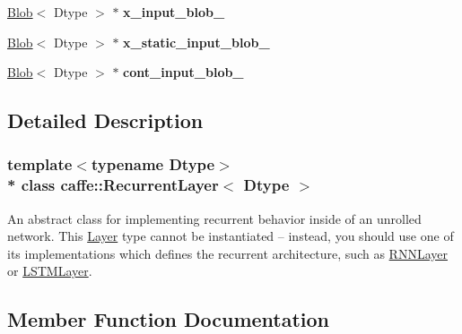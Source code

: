 \begin{DoxyCompactItemize}
\item 
\hyperlink{classcaffe_1_1Blob}{Blob}$<$ Dtype $>$ $\ast$ {\bfseries x\+\_\+input\+\_\+blob\+\_\+}\hypertarget{classcaffe_1_1RecurrentLayer_af32cf697eeee1edd5de1d7b359602ec2}{}\label{classcaffe_1_1RecurrentLayer_af32cf697eeee1edd5de1d7b359602ec2}

\item 
\hyperlink{classcaffe_1_1Blob}{Blob}$<$ Dtype $>$ $\ast$ {\bfseries x\+\_\+static\+\_\+input\+\_\+blob\+\_\+}\hypertarget{classcaffe_1_1RecurrentLayer_aa918e06200e98287778abc5f3d97eeb1}{}\label{classcaffe_1_1RecurrentLayer_aa918e06200e98287778abc5f3d97eeb1}

\item 
\hyperlink{classcaffe_1_1Blob}{Blob}$<$ Dtype $>$ $\ast$ {\bfseries cont\+\_\+input\+\_\+blob\+\_\+}\hypertarget{classcaffe_1_1RecurrentLayer_a3b5f3118aa5a48d54fb624c04b98bd1d}{}\label{classcaffe_1_1RecurrentLayer_a3b5f3118aa5a48d54fb624c04b98bd1d}

\end{DoxyCompactItemize}


\subsection{Detailed Description}
\subsubsection*{template$<$typename Dtype$>$\\*
class caffe\+::\+Recurrent\+Layer$<$ Dtype $>$}

An abstract class for implementing recurrent behavior inside of an unrolled network. This \hyperlink{classcaffe_1_1Layer}{Layer} type cannot be instantiated -- instead, you should use one of its implementations which defines the recurrent architecture, such as \hyperlink{classcaffe_1_1RNNLayer}{R\+N\+N\+Layer} or \hyperlink{classcaffe_1_1LSTMLayer}{L\+S\+T\+M\+Layer}. 

\subsection{Member Function Documentation}
